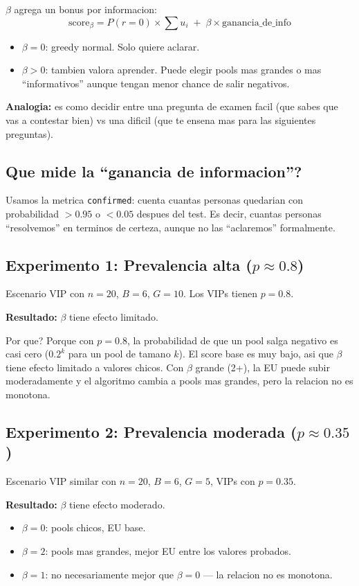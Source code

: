 \documentclass[11pt]{article}
\begin{document}
$\beta$ agrega un bonus por informacion:
$$\text{score}_{\beta} = P(r=0) \times \sum u_i \;+\; \beta \times \text{ganancia\_de\_info}$$

\begin{itemize}
  \item $\beta = 0$: greedy normal. Solo quiere aclarar.
  \item $\beta > 0$: tambien valora aprender. Puede elegir pools mas grandes
        o mas ``informativos'' aunque tengan menor chance de salir negativos.
\end{itemize}

\textbf{Analogia:} es como decidir entre una pregunta de examen facil
(que sabes que vas a contestar bien) vs una dificil (que te ensena mas
para las siguientes preguntas).

\subsection{Que mide la ``ganancia de informacion''?}

Usamos la metrica \texttt{confirmed}: cuenta cuantas personas
quedarian con probabilidad $> 0.95$ o $< 0.05$ despues del test.
Es decir, cuantas personas ``resolvemos'' en terminos de certeza,
aunque no las ``aclaremos'' formalmente.

\subsection{Experimento 1: Prevalencia alta ($p \approx 0.8$)}

Escenario VIP con $n=20$, $B=6$, $G=10$. Los VIPs tienen $p=0.8$.

\textbf{Resultado:} $\beta$ tiene efecto limitado.

Por que? Porque con $p=0.8$, la probabilidad de que un pool salga
negativo es casi cero ($0.2^k$ para un pool de tamano $k$).
El score base es muy bajo, asi que $\beta$ tiene efecto limitado
a valores chicos.
Con $\beta$ grande (2+), la EU puede subir moderadamente
y el algoritmo cambia a pools mas grandes, pero la relacion no es monotona.

\subsection{Experimento 2: Prevalencia moderada ($p \approx 0.35$)}

Escenario VIP similar con $n=20$, $B=6$, $G=5$, VIPs con $p=0.35$.

\textbf{Resultado:} $\beta$ tiene efecto moderado.
\begin{itemize}
  \item $\beta = 0$: pools chicos, EU base.
  \item $\beta = 2$: pools mas grandes, mejor EU entre los valores probados.
  \item $\beta = 1$: no necesariamente mejor que $\beta = 0$ --- la relacion no es monotona.
\end{itemize}
\end{document}

